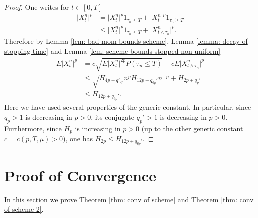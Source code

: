 \documentclass{article}
\begin{document}
\begin{proof}
    One writes for $t\in [0,T]$
    \begin{align}\label{eq: splitting argument}
     \lvert X^n_t \rvert^p&=\lvert X^n_t \rvert^p1_{\tau_n\leq T} +\lvert X^n_t \rvert^p1_{\tau_n\geq T}\nonumber \\
      &\leq \lvert X^n_t \rvert^p1_{\tau_n\leq T} +\lvert X^n_{t\wedge \tau_n} \rvert^p.
    \end{align}
    Therefore by Lemma \ref{lem: bad mom bounds scheme}, Lemma \ref{lemma: decay of stopping time} and Lemma \ref{lem: scheme bounds stopped non-uniform}
    \begin{align}
      E\lvert X^n_t \rvert^p&=c\sqrt{E\lvert X^n_t \rvert^{2p}P(\tau_n\leq T)} +cE\lvert X^n_{t\wedge \tau_n} \rvert^p\nonumber \\
      &\leq \sqrt{H_{4p+q'_{2p}}n^{p}H_{12p+q_{6p}'}n^{-p}}+H_{2p+q_p'}\nonumber \\
      &\leq H_{12p+q_{6p}'}.
    \end{align}
     Here we have used several properties of the generic constant. In particular, since $q_p>1$ is decreasing in $p>0$, its conjugate $q_p'>1$ is decreasing in $p>0$. Furthermore, since $H_p$ is increasing in $p>0$ (up to the other generic constant $c=c(p,T,\mu)>0$), one has $H_{2p}\leq H_{12p+q_{6p}'}$.
\end{proof}

\section{Proof of Convergence}
In this section we prove Theorem \ref{thm: conv of scheme} and Theorem \ref{thm: conv of scheme 2}.
\end{document}
